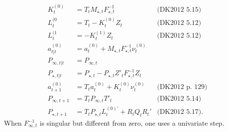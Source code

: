 \documentclass{article}
\begin{document}
\begin{align*}
  K^{(0)}_t &= T_tM_{\star,t}F^{-1}_{\star,t}& \mbox{(DK2012 5.15)}\\
  L^{(0}_t &= T_t - K^{(0)}_tZ_t & \mbox{(DK2012 5.12)}\\
  L^{(1}_t &= - K^{(1)}_tZ_t & \mbox{(DK2012 5.12)}\\
  a^{(0)}_{t|t} &= a^{(0)}_t + M_{\star,t}F^{-1}_{\star,t}\nu^{(0)}_t\\
  P_{\infty,t|t} &= P_{\infty,t} \\
  P_{\star,t|t} &= P_{\star,t} - P_{\star,t}Z'_t
                  F^{-1}_{\star,t}Z_t \\
  a^{(0)}_{t+1} &= T_ta^{(0)}_t + K^{(0)}_t\nu^{(0)}_t & \mbox{(DK2012 
                                                         p. 129)}\\
  P_{\infty,t+ 1} &= T_tP_{\infty,t}T'_t & \mbox{(DK2012 5.14)}\\
  P_{\star, t+1} &= T_tP_{\star,t}L^{(0)'}_t + R_tQ_tR_t' & \mbox{(DK2012 5.17).}
\end{align*}
When $F^{-1}_{\infty,t}$ is singular but different from zero, one uses
a univariate step.
\end{document}
